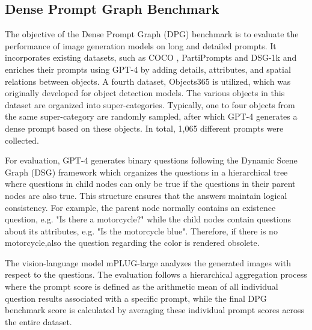 \subsection{Dense Prompt Graph Benchmark}
The objective of the Dense Prompt Graph (\gls{DPG}) benchmark \cite{DPG} is to evaluate the performance of image generation models on long and detailed prompts. It incorporates existing datasets, such as COCO \cite{COCO}, PartiPrompts \cite{yu2022scaling} and DSG-1k \cite{DSG}  and enriches their prompts using GPT-4 \cite{GPT4} by adding details, attributes, and spatial relations between objects. A fourth dataset, Objects365 \cite{Objects365} is utilized, which was originally developed for object detection models. The various objects in this dataset are organized into super-categories. Typically, one to four objects from the same super-category are randomly sampled, after which GPT-4 generates a dense prompt based on these objects. In total, 1,065 different prompts were collected. 

For evaluation, GPT-4 generates binary questions  following the Dynamic Scene Graph (\gls{DSG}) framework \cite{DSG} which organizes the questions in a hierarchical tree where questions in child nodes can only be true if the questions in their parent nodes are also true. This structure ensures that the answers maintain logical consistency. For example, the parent node normally contains an existence question, e.g. "Is there a motorcycle?" while the child nodes contain questions about its attributes, e.g. "Is the motorcycle blue". Therefore, if there is no motorcycle,also the question regarding the color is rendered obsolete.

 The vision-language model mPLUG-large \cite{mplug} analyzes the generated images with respect to the questions. The evaluation follows a hierarchical aggregation process where the prompt score is defined as the arithmetic mean of all individual question results associated with a specific prompt, while the final DPG benchmark score is calculated by averaging these individual prompt scores across the entire dataset.